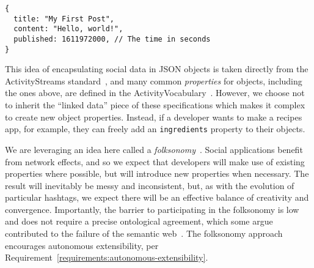 \begin{verbatim}
{
  title: "My First Post",
  content: "Hello, world!",
  published: 1611972000, // The time in seconds
}
\end{verbatim}

This idea of encapsulating social data in JSON objects is
taken directly from the ActivityStreams standard~\cite{activitystreams},
and many common \emph{properties} for objects,
including the ones above, are defined in the
ActivityVocabulary~\cite{activityvocab}.
However, we choose not to inherit the ``linked data'' piece
of these specifications which makes it complex to create new object properties.
Instead, if a developer wants to make a recipes app, for example,
they can freely add an \texttt{ingredients} property to their objects.

We are leveraging an idea here called a \emph{folksonomy}~\cite{folksonomy}.
Social applications
benefit from network effects, and so we expect that developers will make use of
existing properties where possible,
but will introduce new properties when necessary.
The result will inevitably be messy and inconsistent, but, as with the evolution of
particular hashtags, we expect there will be an effective balance of creativity and convergence.
Importantly, the barrier to participating in the folksonomy is low
and does not require a precise ontological agreement,
which some argue contributed to the failure of the semantic
web~\cite{semanticwebtwodecades}.
The folksonomy approach encourages autonomous extensibility,
per Requirement~\ref{requirements:autonomous-extensibility}.


